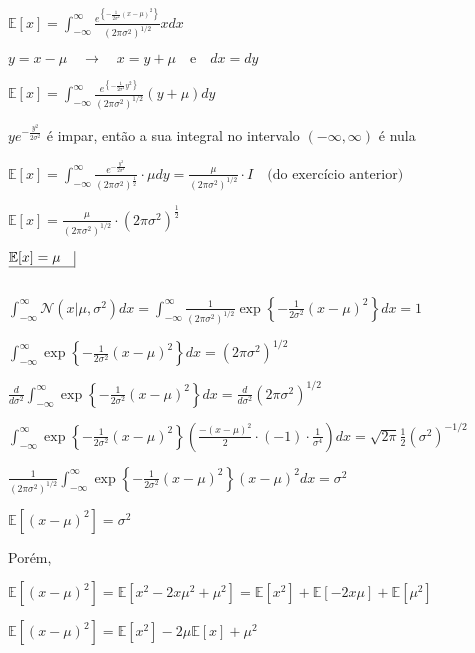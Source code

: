 \begin{enumerate}
    $\mathbb{E}[x]=\int_{-\infty}^{\infty} \frac{e^{\left\{-\frac{1}{2 \sigma^2}(x-\mu)^2\right\}}}{\left(2 \pi \sigma^2\right)^{1/2}} x d x$ 
    
    $y=x-\mu \quad \rightarrow \quad x=y+\mu \quad \text{e} \quad d x=d y$ 
    
    $\mathbb{E}[x]=\int_{-\infty}^{\infty} \frac{e^{\left\{-\frac{1}{2 \sigma^2} y^2\right\}}}{\left(2 \pi \sigma^2\right)^{1 / 2}}(y+\mu) d y$ 
    
     $y e^{-\frac{y^2}{2 \sigma^2}} $ é impar, então a sua integral no intervalo $(-\infty, \infty)$ é nula 
    
    $\mathbb{E}[x]=\int_{-\infty}^{\infty} \frac{e^{-\frac{y^2}{2 \sigma^2}}}{\left(2 \pi \sigma^2\right)^{\frac{1}{2}}} \cdot \mu d y=\frac{\mu}{\left(2 \pi \sigma^2\right)^{1 / 2}} \cdot I \quad \text{(do exercício anterior)}$ 
    
    $\mathbb{E}[x]=\frac{\mu}{\left(2 \pi \sigma^2\right)^{1 / 2}} \cdot\left(2 \pi \sigma^2\right)^{\frac{1}{2}}$
    
    $\underline{\mathbb{E}[x]=\mu \quad} \vline$
    
    $ $


    $ \int_{-\infty}^{\infty}\mathcal{N}(x | \mu, \sigma^2)dx=  \int_{-\infty}^{\infty} \frac{1}{(2\pi\sigma^2)^{1/2}}\exp\left\{ -\frac{1}{2\sigma^2}(x - \mu)^2 \right\} dx = 1 $
    
    $ \int_{-\infty}^{\infty} \exp\left\{ -\frac{1}{2\sigma^2}(x - \mu)^2 \right\} dx = (2\pi\sigma^2)^{1/2} $
    
    $ \frac{d}{d \sigma^2} \int_{-\infty}^{\infty} \exp\left\{ -\frac{1}{2\sigma^2}(x - \mu)^2 \right\} dx = \frac{d}{d \sigma^2} (2\pi\sigma^2)^{1/2} $
    
    $ \int_{-\infty}^{\infty} \exp\left\{ -\frac{1}{2\sigma^2}(x - \mu)^2 \right\} \left( \frac{-(x-\mu)^2}{2} \cdot (-1) \cdot \frac{1}{\sigma^4} \right) dx = \sqrt{2\pi}\frac{1}{2}(\sigma^2)^{-1/2} $
    
    $ \frac{1}{(2\pi\sigma^2)^{1/2}} \int_{-\infty}^{\infty} \exp\left\{ -\frac{1}{2\sigma^2}(x - \mu)^2 \right\} (x-\mu)^2 dx = \sigma^2 $
    
    $\mathbb{E}[(x-\mu)^2] = \sigma^2$
    
    Porém,
    
    $\mathbb{E}[(x-\mu)^2] = \mathbb{E}[x^2-2x\mu^2+\mu^2] =  \mathbb{E}[x^2]+\mathbb{E}[-2x\mu]+ \mathbb{E}[\mu^2]$
    
    $\mathbb{E}[(x-\mu)^2] = \mathbb{E}[x^2]-2\mu\mathbb{E}[x] +\mu^2$
    

\end{enumerate}
